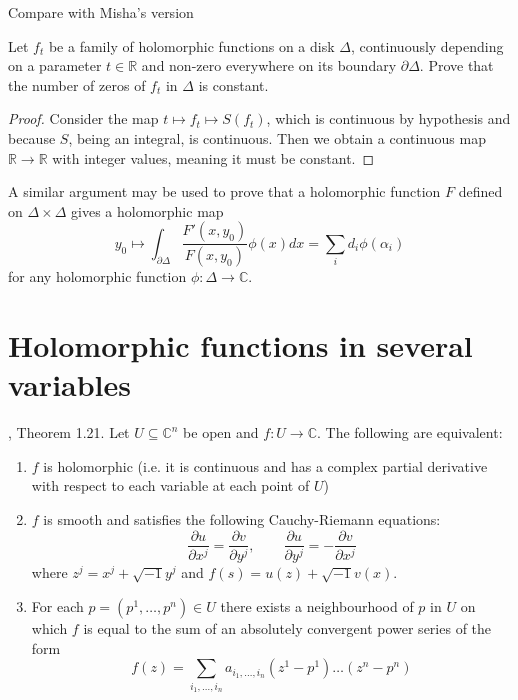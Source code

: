 Compare with Misha's version

\begin{theorem}
\label{theorem-Rouche-theorem-Mishas-version}
Let $f_t$ be a family of holomorphic functions on a disk  $\Delta$, continuously
depending on a parameter $t\in \mathbb{R}$ and non-zero everywhere on its
boundary $\partial\Delta$. Prove that the number of zeros of $f_t$ in $\Delta$
is constant.
\end{theorem}

\begin{proof}
Consider the map $t\mapsto f_t\mapsto S(f_t)$, which is continuous by hypothesis
and because $S$, being an integral, is continuous. Then we obtain a continuous
map $\mathbb{R}\to\mathbb{R}$ with integer values, meaning it must be constant.
\end{proof}

A similar argument may be used to prove that a holomorphic function $F$ defined
on $\Delta\times\Delta$ gives a holomorphic map 
\begin{equation}
\label{equation-zeros-on-polydisk}
y_0\mapsto \int_{\partial\Delta}\frac{F'(x,y_0)}{F(x,y_0)}\phi(x)dx
=\sum_id_i\phi(\alpha_i)
\end{equation}
for any holomorphic function $\phi:\Delta\to\mathbb{C}$.

\section{Holomorphic functions in several variables}
\label{section-holomorphic-functions-in-several-variables}

\begin{lemma}
\label{lemma-holomorphic-function-characterization}
\cite{lec}, Theorem 1.21. Let $U\subseteq\mathbb{C}^n$ be open and $f:U\to
\mathbb{C}$. The following are equivalent:
\begin{enumerate}
\item $f$ is holomorphic (i.e. it is continuous and has a complex partial
derivative with respect to each variable at each point of $U$)
\item $f$ is smooth and satisfies the following Cauchy-Riemann equations:
\begin{equation}
\label{equation-Cauchy-Riemann-several-variables}
\frac{\partial u}{\partial x^j}=\frac{\partial v}{\partial y^j},\qquad 
\frac{\partial u}{\partial y^j}=-\frac{\partial v}{\partial x^j}
\end{equation}
where $z^j=x^j+\sqrt{-1}y^j$ and $f(s)=u(z)+\sqrt{-1}v(x)$.
\item For each $p=(p^1,\ldots,p^n)\in U$ there exists a neighbourhood of $p$ in
$U$ on which $f$ is equal to the sum of an absolutely convergent power series of
the form
\begin{equation}
\label{equation-Taylor-series-several-variables}
f(z)=\sum_{i_1,\ldots,i_n}a_{i_1,\ldots,i_n}(z^1-p^1)\ldots(z^n-p^n)
\end{equation}
\end{enumerate}
\end{lemma}

